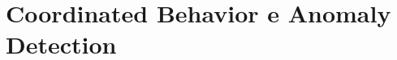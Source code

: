\chapter{Coordinated Behavior e Anomaly Detection}
\label{ch:dm-coordinated-behavior-anomaly-detection}
